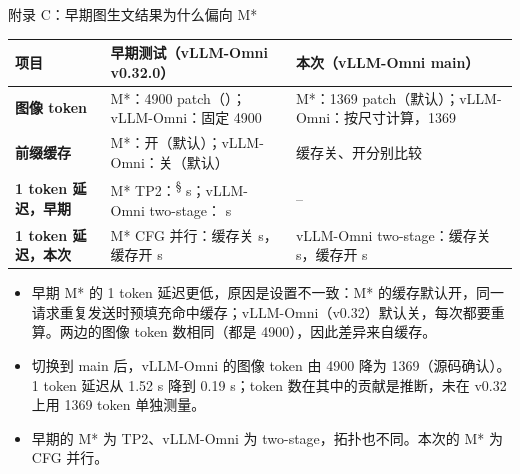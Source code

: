 \begin{frame}[t]{附录 C：早期图生文结果为什么偏向 M*}
\scriptsize\def\codesize{\relax}
\renewcommand{\arraystretch}{1.15}\setlength{\tabcolsep}{3pt}
\begin{tabularx}{\textwidth}{>{\bfseries}p{3.2cm} Y Y}
\toprule
{}
项目 & 早期测试（vLLM-Omni v0.32.0） & 本次（vLLM-Omni main） \\
\midrule
图像 token & M*：4900 patch（）；vLLM-Omni：固定 4900 & M*：1369 patch（默认）；vLLM-Omni：按尺寸计算，1369 \\
前缀缓存 & M*：开（默认）；vLLM-Omni：关（默认） & 缓存关、开分别比较 \\
1 token 延迟，早期 & M* TP2：\textsuperscript{§} s；vLLM-Omni two-stage： s & -- \\
1 token 延迟，本次 & M* CFG 并行：缓存关  s，缓存开  s & vLLM-Omni two-stage：缓存关  s，缓存开  s \\
\bottomrule
\end{tabularx}
\vspace{4pt}
\begin{itemize}\scriptsize\setlength\itemsep{2pt}
  \item 早期 M* 的 1 token 延迟更低，原因是设置不一致：M* 的缓存默认开，同一请求重复发送时预填充命中缓存；vLLM-Omni（v0.32）默认关，每次都要重算。两边的图像 token 数相同（都是 4900），因此差异来自缓存。
  \item 切换到 main 后，vLLM-Omni 的图像 token 由 4900 降为 1369（源码确认）。1 token 延迟从 1.52 s 降到 0.19 s；token 数在其中的贡献是推断，未在 v0.32 上用 1369 token 单独测量。
  \item 早期的 M* 为 TP2、vLLM-Omni 为 two-stage，拓扑也不同。本次的 M* 为 CFG 并行。
\end{itemize}
\end{frame}

